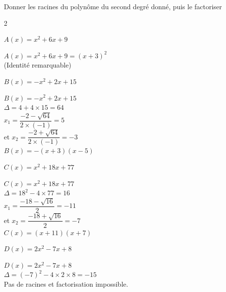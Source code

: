 \documentclass[12pt,a4paper]{article}  %
\begin{document}
Donner les racines du polynôme du second degré donné, puis le factoriser

\begin{multicols}{2}
	\begin{enumMet}
		\item $A(x)=x^{2}+6 x+9$ \quad {}\\
		\begin{corrBox}
			$A(x)=x^{2}+6 x+9=(x+3)^2$\\
			(Identité remarquable)
		\end{corrBox}
		\item {} $B(x)=-x^{2}+2 x+15$ \quad {}\\
		\begin{corrBox}
			$B(x)=-x^{2}+2 x+15$\\
			$\Delta=4+4\times15=64$\\
			$x_1=\dfrac{-2-\sqrt{64}}{2\times(-1)}=5$\\
			et $x_2=\dfrac{-2+\sqrt{64}}{2\times(-1)}=-3$\\
			$B(x)=-(x+3)(x-5)$
		\end{corrBox}
		
		\columnbreak
		\item $C(x)=x^{2}+18 x+77$ \quad {}\\
		\begin{corrBox}
			$C(x)=x^{2}+18 x+77$\\
			$\Delta=18^2-4\times77=16$\\
			$x_1=\dfrac{-18-\sqrt{16}}{2}=-11$\\
			et $x_2=\dfrac{-18+\sqrt{16}}{2}=-7$\\
			$C(x)=(x+11)(x+7)$
		\end{corrBox}
		\item $D(x)=2 x^{2}-7 x+8$\quad {}\\
		\begin{corrBox}
			$D(x)=2 x^{2}-7 x+8$\\
			$\Delta=(-7)^2-4\times2\times8=-15$\\
			Pas de racines et factorisation impossible.
		\end{corrBox}
	\end{enumMet}
\end{multicols}
\end{document}
